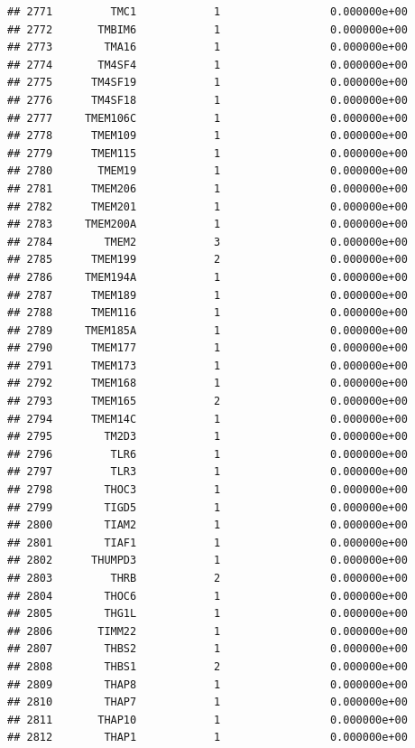 \documentclass[
]{article}
\begin{document}
\begin{verbatim}
## 2771         TMC1            1                 0.000000e+00
## 2772       TMBIM6            1                 0.000000e+00
## 2773        TMA16            1                 0.000000e+00
## 2774       TM4SF4            1                 0.000000e+00
## 2775      TM4SF19            1                 0.000000e+00
## 2776      TM4SF18            1                 0.000000e+00
## 2777     TMEM106C            1                 0.000000e+00
## 2778      TMEM109            1                 0.000000e+00
## 2779      TMEM115            1                 0.000000e+00
## 2780       TMEM19            1                 0.000000e+00
## 2781      TMEM206            1                 0.000000e+00
## 2782      TMEM201            1                 0.000000e+00
## 2783     TMEM200A            1                 0.000000e+00
## 2784        TMEM2            3                 0.000000e+00
## 2785      TMEM199            2                 0.000000e+00
## 2786     TMEM194A            1                 0.000000e+00
## 2787      TMEM189            1                 0.000000e+00
## 2788      TMEM116            1                 0.000000e+00
## 2789     TMEM185A            1                 0.000000e+00
## 2790      TMEM177            1                 0.000000e+00
## 2791      TMEM173            1                 0.000000e+00
## 2792      TMEM168            1                 0.000000e+00
## 2793      TMEM165            2                 0.000000e+00
## 2794      TMEM14C            1                 0.000000e+00
## 2795        TM2D3            1                 0.000000e+00
## 2796         TLR6            1                 0.000000e+00
## 2797         TLR3            1                 0.000000e+00
## 2798        THOC3            1                 0.000000e+00
## 2799        TIGD5            1                 0.000000e+00
## 2800        TIAM2            1                 0.000000e+00
## 2801        TIAF1            1                 0.000000e+00
## 2802      THUMPD3            1                 0.000000e+00
## 2803         THRB            2                 0.000000e+00
## 2804        THOC6            1                 0.000000e+00
## 2805        THG1L            1                 0.000000e+00
## 2806       TIMM22            1                 0.000000e+00
## 2807        THBS2            1                 0.000000e+00
## 2808        THBS1            2                 0.000000e+00
## 2809        THAP8            1                 0.000000e+00
## 2810        THAP7            1                 0.000000e+00
## 2811       THAP10            1                 0.000000e+00
## 2812        THAP1            1                 0.000000e+00

\end{verbatim}
\end{document}
